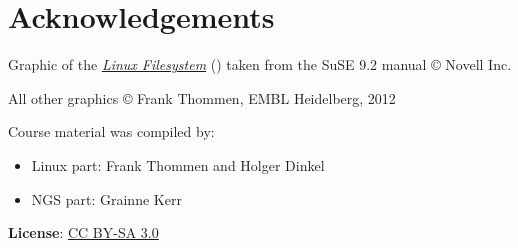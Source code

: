 \documentclass[a4paper,11pt,english]{sphinxmanual}
\begin{document}
\chapter{Acknowledgements}
\label{acknowledgments:acknowledgements}\label{acknowledgments::doc}
Graphic of the {\hyperref[introduction:figure-filesystem]{\emph{Linux Filesystem}}} () taken from the SuSE 9.2 manual © Novell Inc.

All other graphics © Frank Thommen, EMBL Heidelberg, 2012

Course material was compiled by:
\begin{itemize}
\item {} 
Linux part: Frank Thommen and Holger Dinkel

\item {} 
NGS part:   Grainne Kerr

\end{itemize}

\textbf{License}:
\href{http://creativecommons.org/licenses/by-sa/3.0/}{CC BY-SA 3.0}



\renewcommand{\indexname}{Index}
\printindex
\end{document}
